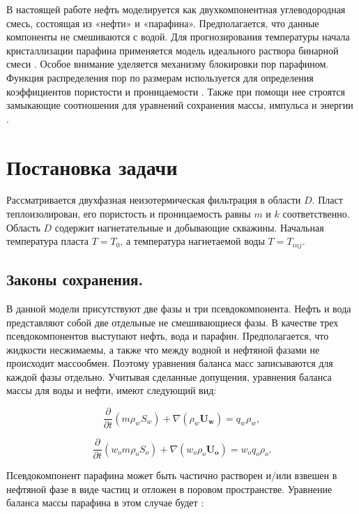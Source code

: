 \documentclass[12pt,twoside,a4paper]{uz_ku}
\begin{document}
	В настоящей работе нефть моделируется как двухкомпонентная углеводородная смесь, состоящая из «нефти» и «парафина». Предполагается, что данные компоненты не смешиваются с водой. Для прогнозирования температуры начала кристаллизации парафина применяется модель идеального раствора бинарной смеси \cite{8}. Особое внимание уделяется механизму блокировки пор парафином. Функция распределения пор по размерам используется для определения коэффициентов пористости и проницаемости \cite{3}. Также при помощи нее строятся замыкающие соотношения для уравнений сохранения массы, импульса и энергии \cite{3, 11, 12}. 

\section{Постановка задачи}
	Рассматривается двухфазная неизотермическая фильтрация в области $D$. Пласт теплоизолирован, его пористость и проницаемость равны $m$ и $k$ соответственно. Область $D$ содержит нагнетательные и добывающие скважины. Начальная температура пласта $T=T_0$, а температура нагнетаемой воды $T=T_{inj}$.

\subsection{Законы сохранения. } 
	В данной модели присутствуют две фазы и три псевдокомпонента. Нефть и вода представляют собой две отдельные не смешивающиеся фазы. В качестве трех псевдокомпонентов выступают нефть, вода и парафин. Предполагается, что жидкости несжимаемы, а также что между водной и нефтяной фазами не происходит массообмен. Поэтому уравнения баланса масс записываются для каждой фазы отдельно. Учитывая сделанные допущения, уравнения баланса массы для воды и нефти, имеют следующий вид:
	
\begin{equation}\label{eq1}
\frac{\partial }{\partial t}(m \rho_w S_w ) + \nabla(\rho_w \mathbf{U_w}) = q_w \rho_w,
\end{equation}

\begin{equation}\label{eq2}
\frac{\partial }{\partial t}(w_o  m \rho_o S_o) + \nabla(w_o \rho_o \mathbf{U_o}) = w_o q_o \rho_o.
\end{equation}

	Псевдокомпонент парафина может быть частично растворен и/или взвешен в нефтяной фазе в виде частиц и отложен в поровом пространстве. Уравнение баланса массы парафина в этом случае будет \cite{6}:
\end{document}
